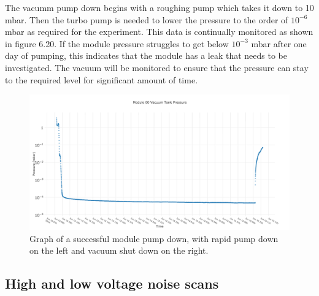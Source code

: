 The vacumm pump down begins with a roughing pump which takes it down to 10 mbar. Then the turbo pump is needed to lower the pressure to the order of $10^{-6}$ mbar as required for the experiment. This data is continually monitored as shown in figure 6.20. If the module pressure struggles to get below $10^{-3}$ mbar after one day of pumping, this indicates that the module has a leak that needs to be investigated. The vacuum will be monitored to ensure that the pressure can stay to the required level for significant amount of time.
\begin{figure}[!h]
\centering
\includegraphics[scale=0.4]{Figures/vactankpressure}
\decoRule
\caption{Graph of a successful module pump down, with rapid pump down on the left and vacuum shut down on the right.}
\label{fig:vactankpressure}
\end{figure}

\subsection{ High and low voltage noise scans}

